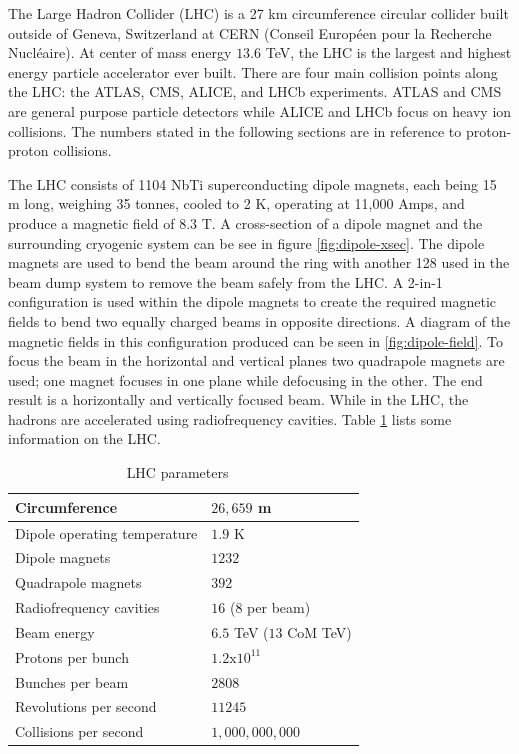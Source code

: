 		The Large Hadron Collider (LHC) is a 27 km circumference circular collider built outside of Geneva, Switzerland at CERN (Conseil Européen pour la Recherche Nucléaire). At center of mass energy $13.6$ TeV, the LHC is the largest and highest energy particle accelerator ever built. There are four main collision points along the LHC: the ATLAS, CMS, ALICE, and LHCb experiments. ATLAS and CMS are general purpose particle detectors while ALICE and LHCb focus on heavy ion collisions. The numbers stated in the following sections are in reference to proton-proton collisions.

		The LHC consists of 1104 NbTi superconducting dipole magnets, each being 15 m long, weighing 35 tonnes, cooled to 2 K, operating at 11,000 Amps, and produce a magnetic field of 8.3 T. A cross-section of a dipole magnet and the surrounding cryogenic system can be see in figure \ref{fig:dipole-xsec}. The dipole magnets are used to bend the beam around the ring with another 128 used in the beam dump system to remove the beam safely from the LHC. A 2-in-1 configuration is used within the dipole magnets to create the required magnetic fields to bend two equally charged beams in opposite directions. A diagram of the magnetic fields in this configuration produced can be seen in \ref{fig:dipole-field}. To focus the beam in the horizontal and vertical planes two quadrapole magnets are used; one magnet focuses in one plane while defocusing in the other. The end result is a horizontally and vertically focused beam. While in the LHC, the hadrons are accelerated using radiofrequency cavities. Table \ref{tab:LHC} lists some information on the LHC. 

		\begin{table}[!thp]
			\centering
			\caption{LHC parameters  ~\cite{lhc-facts}}
			\begin{tabular}{| l | l |}  
			\hline
			Circumference 						& $26,659$ m 					\\ 	\hline
			Dipole operating temperature 		& $1.9$ K 						\\ 	\hline
			Dipole magnets 						& $1232$ 						\\	\hline
			Quadrapole magnets 					& $392$ 						\\	\hline
			Radiofrequency cavities 			& $16$ ($8$ per beam) 			\\ 	\hline
			Beam energy 						& $6.5$ TeV ($13$ CoM TeV) 		\\ \hline
			Protons per bunch 					& $1.2 \mathrm{x} 10^11$ 		\\ \hline
			Bunches per beam 					& $2808$ 						\\ \hline
			Revolutions per second 				& $11245$ 						\\ \hline
			Collisions per second 				& $1,000,000,000$ 				\\ \hline
			\end{tabular}
			\label{tab:LHC}
		\end{table}

